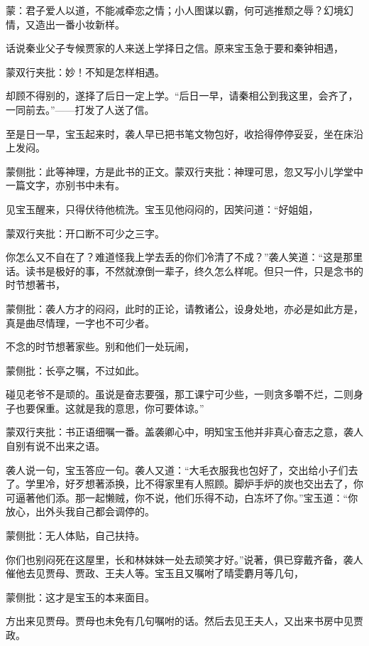 
\begin{parag}

    \begin{note}蒙：君子爱人以道，不能减牵恋之情；小人图谋以霸，何可逃推颓之辱？幻境幻情，又造出一番小妆新样。\end{note}
\end{parag}


\begin{parag}


    话说秦业父子专候贾家的人来送上学择日之信。原来宝玉急于要和秦钟相遇，\begin{note}蒙双行夹批：妙！不知是怎样相遇。\end{note}却顾不得别的，遂择了后日一定上学。“后日一早，请秦相公到我这里，会齐了，一同前去。”——打发了人送了信。
\end{parag}


\begin{parag}


    至是日一早，宝玉起来时，袭人早已把书笔文物包好，收拾得停停妥妥，坐在床沿上发闷。\begin{note}蒙侧批：此等神理，方是此书的正文。蒙双行夹批：神理可思，忽又写小儿学堂中一篇文字，亦别书中未有。\end{note}见宝玉醒来，只得伏待他梳洗。宝玉见他闷闷的，因笑问道：“好姐姐，\begin{note}蒙双行夹批：开口断不可少之三字。\end{note}你怎么又不自在了？难道怪我上学去丢的你们冷清了不成？”袭人笑道：“这是那里话。读书是极好的事，不然就潦倒一辈子，终久怎么样呢。但只一件，只是念书的时节想著书，\begin{note}蒙侧批：袭人方才的闷闷，此时的正论，请教诸公，设身处地，亦必是如此方是，真是曲尽情理，一字也不可少者。\end{note}不念的时节想著家些。别和他们一处玩闹，\begin{note}蒙侧批：长亭之嘱，不过如此。\end{note}碰见老爷不是顽的。虽说是奋志要强，那工课宁可少些，一则贪多嚼不烂，二则身子也要保重。这就是我的意思，你可要体谅。”\begin{note}蒙双行夹批：书正语细嘱一番。盖袭卿心中，明知宝玉他并非真心奋志之意，袭人自别有说不出来之语。\end{note}袭人说一句，宝玉答应一句。袭人又道：“大毛衣服我也包好了，交出给小子们去了。学里冷，好歹想著添换，比不得家里有人照顾。脚炉手炉的炭也交出去了，你可逼著他们添。那一起懒贼，你不说，他们乐得不动，白冻坏了你。”宝玉道：“你放心，出外头我自己都会调停的。\begin{note}蒙侧批：无人体贴，自己扶持。\end{note}你们也别闷死在这屋里，长和林妹妹一处去顽笑才好。”说著，俱已穿戴齐备，袭人催他去见贾母、贾政、王夫人等。宝玉且又嘱咐了晴雯麝月等几句，\begin{note}蒙侧批：这才是宝玉的本来面目。\end{note}方出来见贾母。贾母也未免有几句嘱咐的话。然后去见王夫人，又出来书房中见贾政。
\end{parag}


